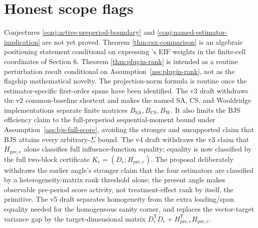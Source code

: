 \documentclass[11pt]{article}
\newcommand{\transpose}{\mathsf{T}}
\theoremstyle{definition}
\theoremstyle{plain}
\theoremstyle{remark}
\begin{document}
\section{Honest scope flags}
Conjectures \ref{conj:active-preperiod-boundary} and
\ref{conj:named-estimator-implication} are not yet proved.  Theorem
\ref{thm:csx-comparison} is an algebraic positioning statement conditional on
expressing \citet{ChenSantAnnaXie2025}'s EIF weights in the finite-cell
coordinates of Section 6.  Theorem
\ref{thm:plugin-rank} is intended as a routine perturbation result conditional
on Assumption~\ref{ass:plugin-rank}, not as the flagship mathematical novelty.
The projection-norm formula is routine once the estimator-specific first-order
spans have been identified.  The v3 draft withdraws the v2 common-baseline
shortcut and makes the named SA, CS, and Wooldridge implementations separate
finite matrices \(B_{\mathrm{SA}},B_{\mathrm{CS}},B_{\mathrm{W}}\).  It also
limits the BJS efficiency claim to the full-preperiod sequential-moment bound
under Assumption~\ref{ass:bjs-full-score}, avoiding the stronger and
unsupported claim that BJS attains every arbitrary-\(\Sigma\) bound.  The v4
draft withdraws the v3 claim that \(H_{\mathrm{pre},e}\) alone classifies full
influence-function equality; equality is now classified by the full two-block
certificate \(K_e=(D_e;H_{\mathrm{pre},e})\).  The
proposal deliberately withdraws the earlier angle's stronger claim that the
four estimators are classified by a heterogeneity-matrix rank threshold alone;
the present angle makes observable pre-period score activity, not
treatment-effect rank by itself, the primitive.  The v5 draft separates
homogeneity from the extra loading/span equality needed for the homogeneous
sanity corner, and replaces the vector-target variance gap by the
target-dimensional matrix \(D_e^{\transpose}D_e+
H_{\mathrm{pre},e}^{\transpose}H_{\mathrm{pre},e}\).
\end{document}
